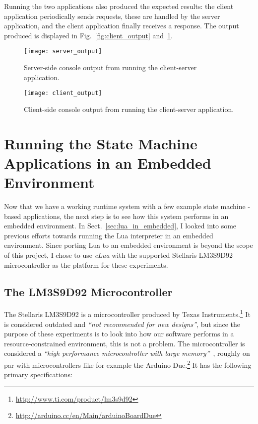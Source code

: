 \noindent
Running the two applications also produced the expected results: the client application periodically sends requests, these are handled by the server application, and the client application finally receives a response. The output produced is displayed in Fig.~\ref{fig:client_output} and~\ref{fig:server_output}.

\begin{figure}[htp]
	\centering
	\begin{minipage}{0.45\linewidth}
		\texttt{[image: server\_output]}
		\caption{Server-side console output from running the client-server application.}
		\label{fig:client_output}
	\end{minipage}
	\quad
	\begin{minipage}{0.45\linewidth}
		\texttt{[image: client\_output]}
		\caption{Client-side console output from running the client-server application.}
		\label{fig:server_output}
	\end{minipage}
\end{figure}

\FloatBarrier
\section{Running the State Machine Applications in an Embedded Environment}
\label{sec:running_on_micro}
Now that we have a working runtime system with a few example state machine -based applications, the next step is to see how this system performs in an embedded environment. In Sect.~\ref{sec:lua_in_embedded}, I looked into some previous efforts towards running the Lua interpreter in an embedded environment. Since porting Lua to an embedded environment is beyond the scope of this project, I chose to use \emph{eLua} with the supported Stellaris LM3S9D92 microcontroller as the platform for these experiments.

\subsection{The LM3S9D92 Microcontroller}
\label{sec:microcontroller}
The Stellaris LM3S9D92 is a microcontroller produced by Texas Instruments.\footnote{\url{http://www.ti.com/product/lm3s9d92}} It is considered outdated and \emph{``not recommended for new designs''}, but since the purpose of these experiments is to look into how our software performs in a resource-constrained environment, this is not a problem. The microcontroller is considered a \emph{``high performance microcontroller with large memory''}~\cite{website:stellaris_micro}, roughly on par with microcontrollers like for example the Arduino Due.\footnote{\url{http://arduino.cc/en/Main/arduinoBoardDue}} It has the following primary specifications:

